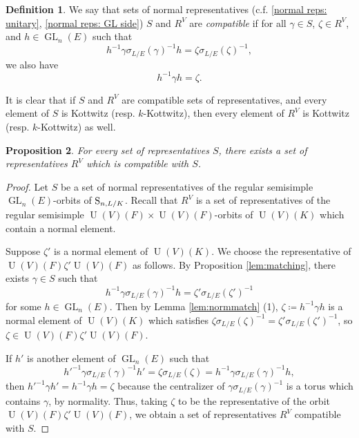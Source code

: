 \documentclass[11pt, reqno]{amsart}
\numberwithin{equation}{subsection}
\theoremstyle{plain}
\newtheorem{proposition}{Proposition}[subsection]
\theoremstyle{definition}
\newtheorem{definition}[proposition]{Definition}
\renewcommand{\S}{\textnormal{S}}
\DeclareMathOperator{\GL}{GL}
\DeclareMathOperator{\U}{U}
\begin{document}
\begin{definition}
\label{def:compatible}
    We say that sets of normal representatives (c.f. \ref{normal reps: unitary}, \ref{normal reps: GL side})
    $S$ and $R^V$ are \emph{compatible} if
    for all $\gamma \in S$, $\zeta \in R^V$,
    and $h \in \GL_n(E)$ such that
    \[
        h^{-1}\gamma\sigma_{L/E}(\gamma)^{-1} h =
        \zeta\sigma_{L/E}(\zeta)^{-1},
    \]
    we also have
    \[
        h^{-1}\gamma h = \zeta.
    \]
\end{definition}

It is clear that if $S$ and $R^V$ are compatible sets
of representatives,
and every element of $S$ is Kottwitz (resp. $k$-Kottwitz),
then every element of $R^V$ is Kottwitz (resp.
$k$-Kottwitz) as well.


\begin{proposition}
\label{lem:compatibleexist}
For every set of representatives $S$, there exists
a set of representatives $R^V$ which is
compatible with $S$.
\end{proposition}
\begin{proof}
Let $S$ be a set of normal representatives of the
regular semisimple $\GL_n(E)$-orbits of $\S_{n, L/K}$.
Recall that $R^V$ is a set of representatives
of the regular semisimple $\U(V)(F) \times
\U(V)(F)$-orbits of $\U(V)(K)$ which
contain a normal element.

Suppose $\zeta'$ is a normal element
of $\U(V)(K)$. 
We choose the representative of
$\U(V)(F)\zeta' \U(V)(F)$ as follows.
By Proposition \ref{lem:matching},
there exists $\gamma \in S$ such that 
\[
    h^{-1}\gamma\sigma_{L/E}(\gamma)^{-1} h
    = \zeta' \sigma_{L/E}(\zeta')^{-1}
\]
for some $h \in \GL_n(E)$.
Then by Lemma \ref{lem:normmatch} (1), 
$\zeta \coloneqq h^{-1}\gamma h$ is a normal
element of $\U(V)(K)$ which satisfies
$\zeta\sigma_{L/E}(\zeta)^{-1} =
\zeta'\sigma_{L/E}(\zeta')^{-1}$, so
$\zeta \in \U(V)(F)\zeta' \U(V)(F)$.

If $h'$ is another element of $\GL_n(E)$ such that
\[
     h'^{-1}\gamma\sigma_{L/E}(\gamma)^{-1} h'
    = \zeta\sigma_{L/E}(\zeta)
    = h^{-1}\gamma\sigma_{L/E}(\gamma)^{-1} h,
\]
then $h'^{-1}\gamma h' = h^{-1}\gamma h = \zeta$ because
the centralizer of $\gamma\sigma_{L/E}(\gamma)^{-1}$
is a torus which contains $\gamma$, by normality.
Thus, taking $\zeta$ to be the representative
of the orbit $\U(V)(F)\zeta' \U(V)(F)$, we obtain
a set of representatives $R^V$ compatible with $S$.
\end{proof}
\end{document}
